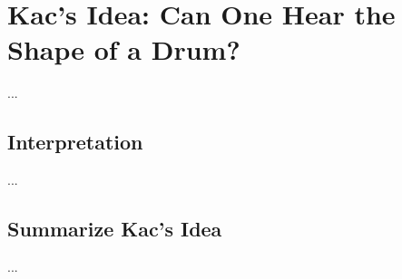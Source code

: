 \section{Kac's Idea: Can One Hear the Shape of a Drum?}

...


\subsection{Interpretation}


...


\subsection{Summarize Kac's Idea}

...





